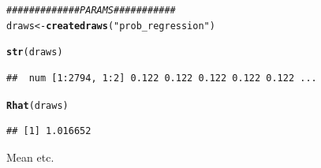 \documentclass{article}\usepackage[]{graphicx}\usepackage[]{color}
\makeatletter
\newcommand{\hlstr}[1]{\textcolor[rgb]{0.192,0.494,0.8}{#1}}%
\newcommand{\hlcom}[1]{\textcolor[rgb]{0.678,0.584,0.686}{\textit{#1}}}%
\newcommand{\hlstd}[1]{\textcolor[rgb]{0.345,0.345,0.345}{#1}}%
\newcommand{\hlkwb}[1]{\textcolor[rgb]{0.69,0.353,0.396}{#1}}%
\newcommand{\hlkwd}[1]{\textcolor[rgb]{0.737,0.353,0.396}{\textbf{#1}}}%
\newenvironment{kframe}{%
 \def\at@end@of@kframe{}%
 \ifinner\ifhmode%
  \def\at@end@of@kframe{\end{minipage}}%
  \begin{minipage}{\columnwidth}%
 \fi\fi%
 \def\FrameCommand##1{\hskip\@totalleftmargin \hskip-\fboxsep
 \colorbox{shadecolor}{##1}\hskip-\fboxsep
     \hskip-\linewidth \hskip-\@totalleftmargin \hskip\columnwidth}%
 \MakeFramed {\advance\hsize-\width
   \@totalleftmargin\z@ \linewidth\hsize
   \@setminipage}}%
 {\par\unskip\endMakeFramed%
 \at@end@of@kframe}
\newenvironment{knitrout}{}{} %
\makeatother
\begin{document}
\begin{knitrout}
\color{fgcolor}\begin{kframe}
\begin{alltt}
\hlcom{############# PARAMS###########}
\hlstd{draws} \hlkwb{<-} \hlkwd{createdraws}\hlstd{(}\hlstr{"prob_regression"}\hlstd{)}

\hlkwd{str}\hlstd{(draws)}
\end{alltt}
\begin{verbatim}
##  num [1:2794, 1:2] 0.122 0.122 0.122 0.122 0.122 ...
\end{verbatim}
\begin{alltt}
\hlkwd{Rhat}\hlstd{(draws)}
\end{alltt}
\begin{verbatim}
## [1] 1.016652
\end{verbatim}
\end{kframe}
\end{knitrout}

Mean etc.
\end{document}
